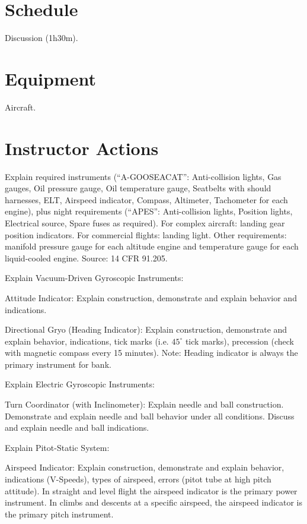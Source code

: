 \documentclass[twoside,openright]{report}
\begin{document}
\section{Schedule}

Discussion (1h30m).

\section{Equipment}

Aircraft.

\section{Instructor Actions}

Explain required instruments (``A-GOOSEACAT'': Anti-collision lights, Gas
gauges, Oil pressure gauge, Oil temperature gauge, Seatbelts with should
harnesses, ELT, Airspeed indicator, Compass, Altimeter, Tachometer for each
engine), plus night requirements (``APES'': Anti-collision lights, Position
lights, Electrical source, Spare fuses as required). For complex aircraft:
landing gear position indicators. For commercial flights: landing light. Other
requirements: manifold pressure gauge for each altitude engine and temperature
gauge for each liquid-cooled engine. Source: 14 CFR 91.205.

Explain Vacuum-Driven Gyroscopic Instruments:

Attitude Indicator: Explain construction, demonstrate and explain behavior and
indications.

Directional Gryo (Heading Indicator): Explain construction, demonstrate and
explain behavior, indications, tick marks (i.e. $45^{\circ}$ tick marks),
precession (check with magnetic compass every 15 minutes). Note: Heading
indicator is always the primary instrument for bank.

Explain Electric Gyroscopic Instruments:

Turn Coordinator (with Inclinometer): Explain needle and ball construction.
Demonstrate and explain needle and ball behavior under all conditions. Discuss
and explain needle and ball indications.

Explain Pitot-Static System:

Airspeed Indicator: Explain construction, demonstrate and explain behavior,
indications (V-Speeds), types of airspeed, errors (pitot tube at high pitch
attitude). In straight and level flight the airspeed indicator is the primary
power instrument. In climbs and descents at a specific airspeed, the airspeed
indicator is the primary pitch instrument.
\end{document}
